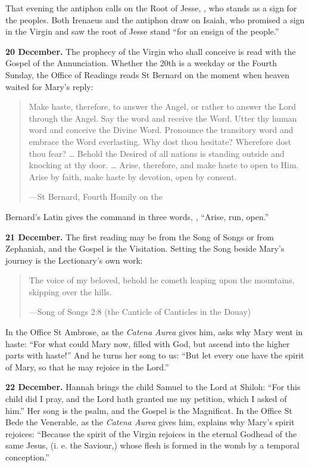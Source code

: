 \noindent That evening the antiphon calls on the Root of Jesse,
, who stands as a sign for the peoples. Both
Irenaeus and the antiphon draw on Isaiah, who promised a sign in the Virgin and
saw the root of Jesse stand ``for an ensign of the people.''

\textbf{20 December.} The prophecy of the Virgin who shall conceive is read with
the Gospel of the Annunciation. Whether the 20th is a weekday or the Fourth
Sunday, the Office of Readings reads St Bernard on the moment when heaven waited
for Mary's reply:

\begin{quote}
Make haste, therefore, to answer the Angel, or rather to answer the Lord through
the Angel. Say the word and receive the Word. Utter thy human word and conceive
the Divine Word. Pronounce the transitory word and embrace the Word everlasting.
Why dost thou hesitate? Wherefore dost thou fear? \ldots{} Behold the Desired of
all nations is standing outside and knocking at thy door. \ldots{} Arise,
therefore, and make haste to open to Him. Arise by faith, make haste by
devotion, open by consent.\par
{\smallskip\noindent\small ---St Bernard, Fourth Homily on the \par}
\end{quote}

\noindent Bernard's Latin gives the command in three words, , ``Arise, run, open.''

\textbf{21 December.} The first reading may be from the Song of Songs or from
Zephaniah, and the Gospel is the Visitation. Setting the Song beside Mary's
journey is the Lectionary's own work:

\begin{quote}
The voice of my beloved, behold he cometh leaping upon the mountains, skipping
over the hills.\par
{\smallskip\noindent\small ---Song of Songs 2:8 (the Canticle of Canticles in the Douay)\par}
\end{quote}

\noindent In the Office St Ambrose, as the \emph{Catena Aurea} gives him, asks
why Mary went in haste: ``For what could Mary now, filled with God, but ascend
into the higher parts with haste!'' And he turns her song to us: ``But let every
one have the spirit of Mary, so that he may rejoice in the Lord.''

\textbf{22 December.} Hannah brings the child Samuel to the Lord at Shiloh:
``For this child did I pray, and the Lord hath granted me my petition, which I
asked of him.'' Her song is the psalm, and the Gospel is the Magnificat. In the
Office St Bede the Venerable, as the \emph{Catena Aurea} gives him, explains why Mary's
spirit rejoices: ``Because the
spirit of the Virgin rejoices in the eternal Godhead of the same Jesus, (i. e.
the Saviour,) whose flesh is formed in the womb by a temporal conception.''

